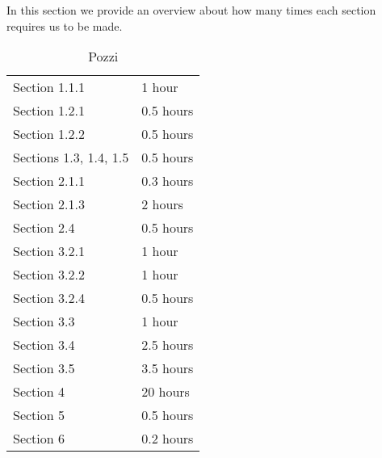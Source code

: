 In this section we provide an overview about how many times each section requires us to be made.


\begin{table} [H]
\centering
{}
{\centering
\begin{tabular}{m{2.5in}|m{.9in}}
Section 1.1.1 & 1 hour\\
Section 1.2.1 & 0.5 hours\\
Section 1.2.2 & 0.5 hours\\
Sections 1.3, 1.4, 1.5 & 0.5 hours\\
Section 2.1.1 & 0.3 hours\\
Section 2.1.3 & 2 hours\\
Section 2.4 & 0.5 hours\\
Section 3.2.1 & 1 hour\\
Section 3.2.2 & 1 hour\\
Section 3.2.4 & 0.5 hours\\
Section 3.3 & 1 hour\\
Section 3.4 & 2.5 hours\\
Section 3.5 & 3.5 hours\\
Section 4 & 20 hours\\
Section 5 & 0.5 hours\\
Section 6 & 0.2 hours
\end{tabular}
}
\caption{Pozzi}
\end{table}
